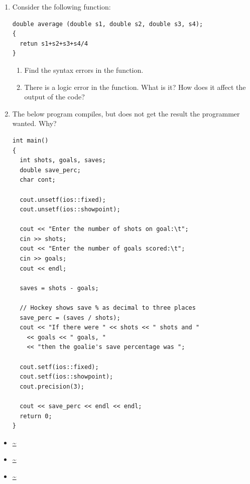 \begin{enumerate}
	\item Consider the following function:
	
\noindent\begin{minipage}{\linewidth}\begin{lstlisting}
double average (double s1, double s2, double s3, s4);
{
  retun s1+s2+s3+s4/4
}
\end{lstlisting}\end{minipage}

		\begin{enumerate}
		\item Find the syntax errors in the function.
		\item There is a logic error in the function. What is it? How does it affect the output of the code?
		\end{enumerate}

  \item The below program compiles, but does not get the result the programmer wanted. Why?

\noindent\begin{minipage}{\linewidth}\begin{lstlisting}
int main()
{
  int shots, goals, saves;
  double save_perc;
  char cont;

  cout.unsetf(ios::fixed);
  cout.unsetf(ios::showpoint);

  cout << "Enter the number of shots on goal:\t";
  cin >> shots;
  cout << "Enter the number of goals scored:\t";
  cin >> goals;
  cout << endl;

  saves = shots - goals;

  // Hockey shows save % as decimal to three places
  save_perc = (saves / shots); 
  cout << "If there were " << shots << " shots and " 
    << goals << " goals, " 
    << "then the goalie's save percentage was ";

  cout.setf(ios::fixed);
  cout.setf(ios::showpoint);
  cout.precision(3);
  
  cout << save_perc << endl << endl;
  return 0;
}
\end{lstlisting}\end{minipage}


\end{enumerate}



\begin{itemize}
\item \url{~}
\item \url{~}
\item \url{~}
\end{itemize}	

